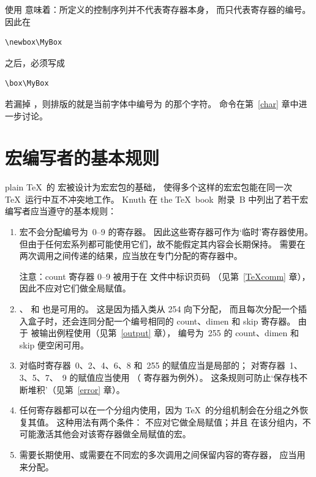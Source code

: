 \documentclass[a4paper]{rapport3}
\def\TeXbook{the \TeX\ book}\def\web{{\sc web}}
\begin{document}
使用  意味着：所定义的控制序列并不代表寄存器本身，
而只代表寄存器的编号。因此在 \begin{verbatim}
\newbox\MyBox
\end{verbatim}
之后，必须写成 \begin{verbatim}
\box\MyBox
\end{verbatim} 
若漏掉 ，则排版的就是当前字体中编号为  的那个字符。
 命令在第~\ref{char} 章中进一步讨论。

\section{宏编写者的基本规则}

plain \TeX\ 的  宏被设计为宏宏包的基础，
使得多个这样的宏宏包能在同一次 \TeX\ 运行中互不冲突地工作。
Knuth 在 \TeXbook\ 附录~B 中列出了若干宏编写者应当遵守的基本规则：
\begin{enumerate}
\item {} 宏不会分配编号为~0--9 的寄存器。
因此这些寄存器可作为`临时'寄存器使用。
但由于任何宏系列都可能使用它们，故不能假定其内容会长期保持。
需要在两次调用之间传递的结果，应当放在专门分配的寄存器中。

注意：count 寄存器 0--9 被用于在  文件中标识页码
（见第~\ref{TeXcomm} 章），因此不应对它们做全局赋值。

\item {}、 和  也是可用的。
这是因为插入类从 254 向下分配，
而且每次分配一个插入盒子时，还会连同分配一个编号相同的 count、dimen 和 skip 寄存器。
由于  被输出例程使用（见第~\ref{output} 章），
编号为~255 的 count、dimen 和 skip 便空闲可用。

\item 对临时寄存器~0、2、4、6、8 和~255 的赋值应当是局部的；
对寄存器~1、3、5、7、~9 的赋值应当使用 
（ 寄存器为例外）。
这条规则可防止`保存栈不断堆积'（见第~\ref{error} 章）。

\item 任何寄存器都可以在一个分组内使用，因为 \TeX\ 的分组机制会在分组之外恢复其值。
这种用法有两个条件：
不应对它做全局赋值；并且
在该分组内，不可能激活其他会对该寄存器做全局赋值的宏。

\item 需要长期使用、或需要在不同宏的多次调用之间保留内容的寄存器，
应当用  来分配。
\end{enumerate}
\end{document}
